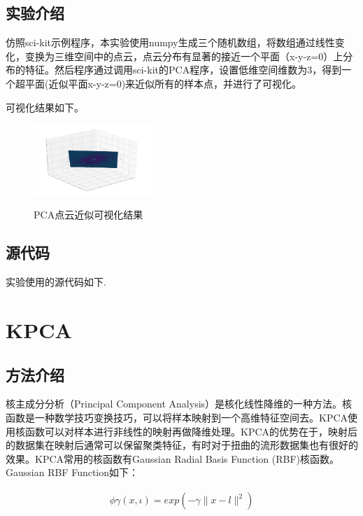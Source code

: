 \documentclass[UTF8]{ctexart}
\begin{document}
\subsection{实验介绍}
仿照sci-kit示例程序，本实验使用numpy生成三个随机数组，将数组通过线性变化，变换为三维空间中的点云，点云分布有显著的接近一个平面（x-y-z=0）上分布的特征。然后程序通过调用sci-kit的PCA程序，设置低维空间维数为3，得到一个超平面(近似平面x-y-z=0)来近似所有的样本点，并进行了可视化。

可视化结果如下。

	\begin{figure}[H]
	  \centering
	  \label{fig:Per6A}\includegraphics[width=0.4\textwidth]{pca.png}\
	  \caption{PCA点云近似可视化结果}
	  \label{fig:oscil}    
	\end{figure}

\subsection{源代码}
实验使用的源代码如下.  \vspace{5mm}
	
	\vspace{3mm}






\newpage
\section{KPCA}
\subsection{方法介绍}
核主成分分析（Principal Component Analysis）是核化线性降维的一种方法。核函数是一种数学技巧变换技巧，可以将样本映射到一个高维特征空间去。KPCA使用核函数可以对样本进行非线性的映射再做降维处理。KPCA的优势在于，映射后的数据集在映射后通常可以保留聚类特征，有时对于扭曲的流形数据集也有很好的效果。KPCA常用的核函数有Gaussian Radial Basis Function (RBF)核函数。Gaussian RBF Function如下：

\begin{align*}
		\phi \gamma(x,\iota) = exp(-\gamma \lVert x-l \rVert ^2)\\
\end{align*}
\end{document}
